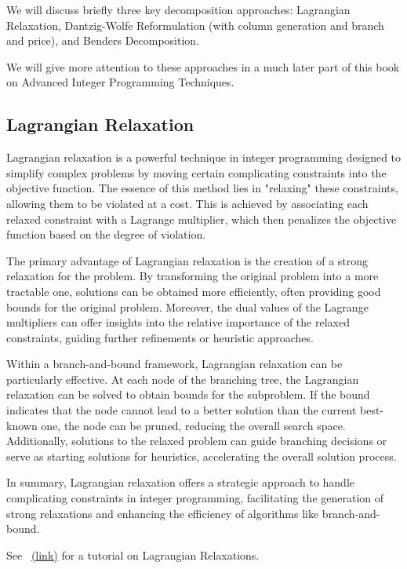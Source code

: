 We will discuss briefly three key decomposition approaches: Lagrangian Relaxation, Dantzig-Wolfe Reformulation (with column generation and branch and price), and Benders Decomposition.

We will give more attention to these approaches in a much later part of this book on Advanced Integer Programming Techniques.

\subsection{Lagrangian Relaxation}



Lagrangian relaxation is a powerful technique in integer programming designed to simplify complex problems by moving certain complicating constraints into the objective function. The essence of this method lies in "relaxing" these constraints, allowing them to be violated at a cost. This is achieved by associating each relaxed constraint with a Lagrange multiplier, which then penalizes the objective function based on the degree of violation.

The primary advantage of Lagrangian relaxation is the creation of a strong relaxation for the problem. By transforming the original problem into a more tractable one, solutions can be obtained more efficiently, often providing good bounds for the original problem. Moreover, the dual values of the Lagrange multipliers can offer insights into the relative importance of the relaxed constraints, guiding further refinements or heuristic approaches.

Within a branch-and-bound framework, Lagrangian relaxation can be particularly effective. At each node of the branching tree, the Lagrangian relaxation can be solved to obtain bounds for the subproblem. If the bound indicates that the node cannot lead to a better solution than the current best-known one, the node can be pruned, reducing the overall search space. Additionally, solutions to the relaxed problem can guide branching decisions or serve as starting solutions for heuristics, accelerating the overall solution process.

In summary, Lagrangian relaxation offers a strategic approach to handle complicating constraints in integer programming, facilitating the generation of strong relaxations and enhancing the efficiency of algorithms like branch-and-bound.



See~\cite{Fisher2004}  \href{https://my.eng.utah.edu/~kalla/phy_des/lagrange-relax-tutorial-fisher.pdf}{(link)} for a tutorial on Lagrangian Relaxations.



